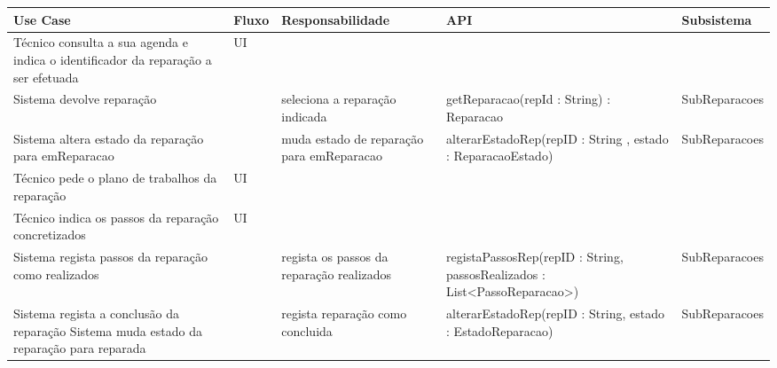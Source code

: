 \documentclass[../relatorio.tex]{subfiles}
\begin{document}
\begin{landscape}
    \begin{table}[!h]
        \centering
        \begin{tabular}{|p{5cm}|p{1cm}|p{4cm}|p{6cm}|p{3cm}|}
            \hline
            \rowcolor{gray!20!white}
            Use Case & Fluxo                                            & Responsabilidade & API & Subsistema \\
            \hline
            \rowcolor{yellow}
            Técnico consulta a sua agenda e indica o identificador da reparação a ser efetuada
                     & UI
                     & 
                     & 
                     & 
            \\
            \hline
            Sistema devolve reparação
                     & 
                     & seleciona a reparação indicada
                     & getReparacao(repId : String) : Reparacao
                     & SubReparacoes
            \\
            \hline
            Sistema altera estado da reparação para emReparacao
                     & 
                     & muda estado de reparação para emReparacao
                     & alterarEstadoRep(repID : String , estado : ReparacaoEstado)
                     & SubReparacoes
            \\
            \hline
            \rowcolor{yellow}
            Técnico pede o plano de trabalhos da reparação
                     & UI
                     & 
                     & 
                     & 
            \\
            \hline
            \rowcolor{yellow}
            Técnico indica os passos da reparação concretizados
                     & UI
                     & 
                     & 
                     & 
            \\
            \hline
            Sistema regista passos da reparação como realizados
                     & 
                     & regista os passos da reparação realizados 
                     & registaPassosRep(repID : String, passosRealizados : List<PassoReparacao>)
                     & SubReparacoes
            \\
            \hline
            Sistema regista a conclusão da reparação
            Sistema muda estado da reparação para reparada
                     & 
                     & regista reparação como concluida
                     & alterarEstadoRep(repID : String, estado : EstadoReparacao)
                     & SubReparacoes

\end{tabular}
\end{table}
\end{landscape}
\end{document}
